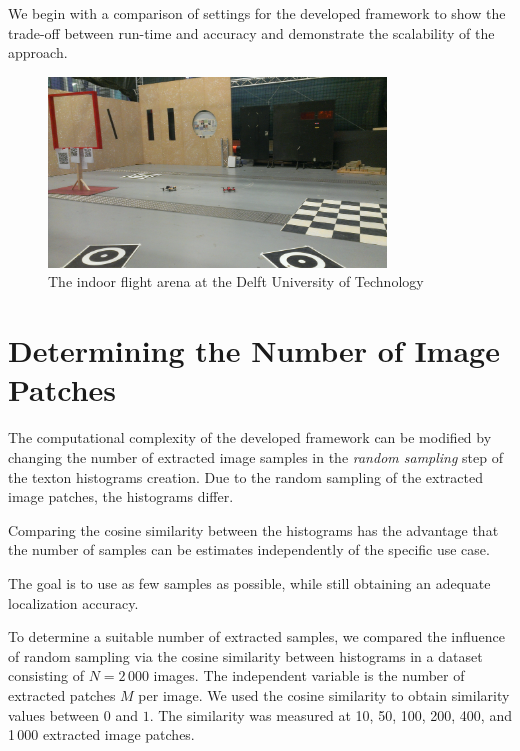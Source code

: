 \documentclass[11pt]{report}
\begin{document}
We begin with a comparison of settings for the developed framework to
show the trade-off between run-time and accuracy and demonstrate the
scalability of the approach.


\begin{figure}[t]
  \centering
 \includegraphics[width=0.8\textwidth]{cyberzoo} 
  \caption{The indoor flight arena at the Delft University of Technology
  }
    \label{fig:cyberzoo}
\end{figure}



\section{Determining the Number of Image Patches}
\label{sec:numtextons}

The computational complexity of the developed framework can be
modified by changing the number of extracted image samples in the
\emph{random sampling} step of the texton histograms creation. Due to
the random sampling of the extracted image patches, the histograms
differ.

Comparing the cosine similarity between the histograms has the
advantage that the number of samples can be estimates independently of
the specific use case.


The goal is to use as few samples as possible, while still obtaining
an adequate localization accuracy.

To determine a suitable number of extracted samples, we compared the
influence of random sampling via the cosine similarity between
histograms in a dataset consisting of $N = 2\,000$ images. The
independent variable is the number of extracted patches $M$ per image.
We used the cosine similarity to obtain similarity values between $0$
and $1$. The similarity was measured at 10, 50, 100, 200, 400, and
1\,000 extracted image patches.
\end{document}
